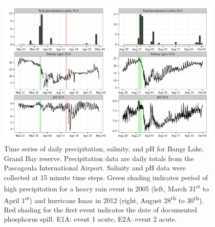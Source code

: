 \documentclass[letterpaper,12pt]{article}\usepackage[]{graphicx}\usepackage[]{color}
\makeatletter
\def\maxwidth{ %
  \ifdim\Gin@nat@width>\linewidth
    \linewidth
  \else
    \Gin@nat@width
  \fi
}
\makeatother
\begin{document}
\begin{figure}[!ht]

{\centering \includegraphics[width=\maxwidth]{figs/tsplotexp-1} 

}

\caption[Time series of daily precipitation, salinity, and pH for Bangs Lake, Grand Bay reserve]{Time series of daily precipitation, salinity, and pH for Bangs Lake, Grand Bay reserve.  Precipitation data are daily totals from the Pascagoula International Airport.  Salinity and pH data were collected at 15 minute time steps.  Green shading indicates period of high precipitation for a heavy rain event in 2005 (left, March 31\textsuperscript{st} to April 1\textsuperscript{st}) and hurricane Isaac in 2012 (right, August 28\textsuperscript{th} to 30\textsuperscript{th}).  Red shading for the first event indicates the date of documented phosphorus spill.  E1A: event 1 acute, E2A: event 2 acute.}\label{fig:tsplotexp}
\end{figure}


\clearpage
\end{document}
